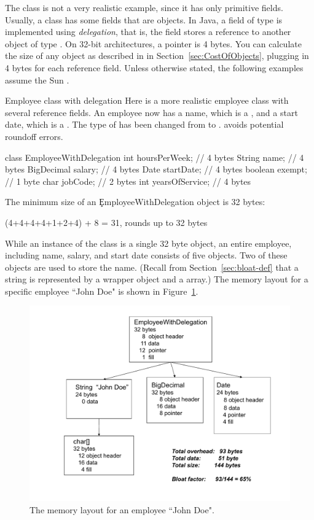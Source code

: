 The  class is not a very realistic example, since it has only
primitive fields. Usually, a class has some fields that are objects.  In Java,
a field of type  is implemented using \textit{delegation},
that is, the field stores a reference to another object of type
. On 32-bit architectures, a pointer is 4 bytes. You can
calculate the size of any object as described in in
Section~\ref{sec:CostOfObjects}, plugging in 4 bytes for each reference field.
Unless otherwise stated, the following examples assume the Sun \jre.
\begin{example}{Employee class with delegation}
Here is a more realistic employee class with several reference fields. An
employee now has a name, which is a , and a start date, which is a
. The type of  has been changed from 
to .  avoids potential roundoff errors.
\begin{verbatim2} 
class EmployeeWithDelegation {
    int hoursPerWeek;           // 4 bytes
    String name;                // 4 bytes
    BigDecimal salary;          // 4 bytes
    Date startDate;             // 4 bytes
    boolean exempt;             // 1 byte
    char jobCode;               // 2 bytes
    int yearsOfService;         // 4 bytes
}
\end{verbatim2}
The minimum size of an \c{EmployeeWithDelegation} object is 32 bytes:
\begin{verbatim2}
(4+4+4+4+1+2+4) + 8 = 31, rounds up to 32 bytes
\end{verbatim2}
\end{example}

While an instance of the  class is a single 32
byte object, an entire employee, including name, salary, and start date
consists of five objects. Two of these objects are used to store the name.
(Recall from Section~\ref{sec:bloat-def} that a string is represented by a
wrapper  object and a  array.) The memory layout for
a specific employee ``John Doe" is shown in Figure~\ref{fig:employee-status}.
 \begin{figure}
  \centering
 \includegraphics[width=.80\textwidth]{Figures/chapter4/employee-status.pdf}
  \caption{The memory layout for an employee ``John Doe".}
  \label{fig:employee-status}
\end{figure}

